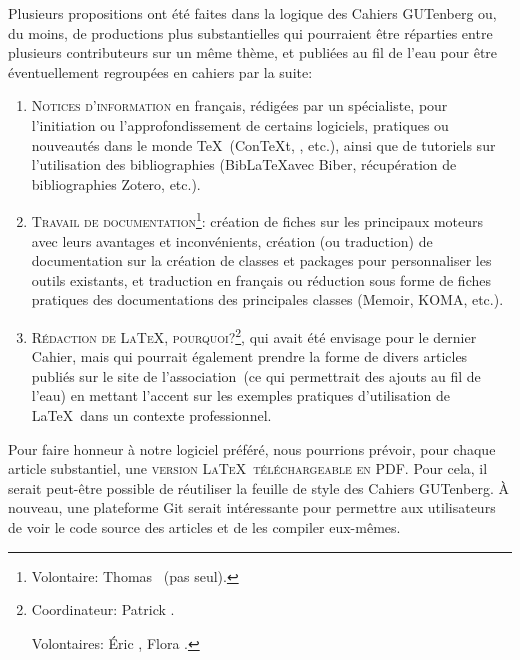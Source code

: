 \documentclass{tufte-handout}
\newcommand{\ratio}[3][]{\marginpar{\footnotesize{\textcolor{teal}{Temps requis: #2 / Utilité: #3}\par\noindent \textcolor{teal}{#1}}}}
\begin{document}
Plusieurs propositions\ratio[Contributions substantielles, mais réparties entre les auteurs]{+++}{+++} ont été faites dans la logique des Cahiers GUTenberg ou, du moins, de productions plus substantielles qui pourraient être réparties entre plusieurs contributeurs sur un même thème, et publiées au fil de l'eau pour être éventuellement regroupées en cahiers par la suite:

\begin{enumerate}
	\item\textsc{Notices d'information}\ratio[Individuellement assez peu chronophage, d'autant que certaines ressources existent]{++}{+++} en français, rédigées par un spécialiste, pour l'initiation ou l'approfondissement de certains logiciels, pratiques ou nouveautés dans le monde \TeX\ (Con\TeX t, \LuaTeX, etc.), ainsi que de tutoriels sur l'utilisation des bibliographies (Bib\LaTeX avec Biber, récupération de bibliographies Zotero, etc.).
	\item\textsc{Travail de documentation}\ratio[Plus ou moins chronophage selon les projets]{++}{+++}\footnote{Volontaire: Thomas ~(pas seul).}: création de fiches sur les principaux moteurs avec leurs avantages et inconvénients, création (ou traduction) de documentation sur la création de classes et packages pour personnaliser les outils existants, et traduction en français ou réduction sous forme de fiches pratiques des documentations des principales classes (Memoir, KOMA, etc.).
	\item\textsc{Rédaction de \LaTeX, pourquoi?}\ratio[Plusieurs contributions sont dans les tuyaux]{++}{+++}\footnote{Coordinateur: Patrick .\par\noindent Volontaires: Éric , Flora .}, qui avait été envisage pour le dernier Cahier, mais qui pourrait également prendre la forme de divers articles publiés sur le site de l'association~(ce qui permettrait des ajouts au fil de l'eau) en mettant l'accent sur les exemples pratiques d'utilisation de \LaTeX\ dans un contexte professionnel.
\end{enumerate}

Pour faire honneur à notre logiciel préféré\ratio[Possibilité d'automatisation]{+}{+++}, nous pourrions prévoir, pour chaque article substantiel, une \textsc{version \LaTeX\ téléchargeable en PDF}. Pour cela, il serait peut-être possible de réutiliser la feuille de style des Cahiers GUTenberg. À nouveau, une plateforme Git serait intéressante pour permettre aux utilisateurs de voir le code source des articles et de les compiler eux-mêmes.
\end{document}
